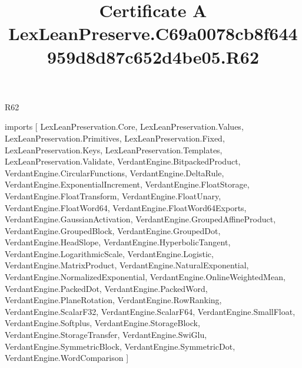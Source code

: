 \begin{lexlean}{R62}
\title{Certificate A LexLeanPreserve.C69a0078cb8f644959d8d87c652d4be05.R62}
\begin{coremodule}
imports [
  LexLeanPreservation.Core,
  LexLeanPreservation.Values,
  LexLeanPreservation.Primitives,
  LexLeanPreservation.Fixed,
  LexLeanPreservation.Keys,
  LexLeanPreservation.Templates,
  LexLeanPreservation.Validate,
  VerdantEngine.BitpackedProduct,
  VerdantEngine.CircularFunctions,
  VerdantEngine.DeltaRule,
  VerdantEngine.ExponentialIncrement,
  VerdantEngine.FloatStorage,
  VerdantEngine.FloatTransform,
  VerdantEngine.FloatUnary,
  VerdantEngine.FloatWord64,
  VerdantEngine.FloatWord64Exports,
  VerdantEngine.GaussianActivation,
  VerdantEngine.GroupedAffineProduct,
  VerdantEngine.GroupedBlock,
  VerdantEngine.GroupedDot,
  VerdantEngine.HeadSlope,
  VerdantEngine.HyperbolicTangent,
  VerdantEngine.LogarithmicScale,
  VerdantEngine.Logistic,
  VerdantEngine.MatrixProduct,
  VerdantEngine.NaturalExponential,
  VerdantEngine.NormalizedExponential,
  VerdantEngine.OnlineWeightedMean,
  VerdantEngine.PackedDot,
  VerdantEngine.PackedWord,
  VerdantEngine.PlaneRotation,
  VerdantEngine.RowRanking,
  VerdantEngine.ScalarF32,
  VerdantEngine.ScalarF64,
  VerdantEngine.SmallFloat,
  VerdantEngine.Softplus,
  VerdantEngine.StorageBlock,
  VerdantEngine.StorageTransfer,
  VerdantEngine.SwiGlu,
  VerdantEngine.SymmetricBlock,
  VerdantEngine.SymmetricDot,
  VerdantEngine.WordComparison
]


\end{coremodule}
\end{lexlean}
